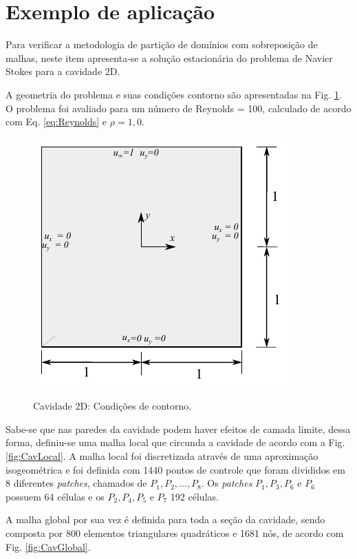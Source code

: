 \documentclass[tese_patricia]{subfiles}
\begin{document}
\section{Exemplo de aplicação}

Para verificar a metodologia de partição de domínios com sobreposição de malhas, neste item apresenta-se a solução estacionária do problema de Navier Stokes para a cavidade 2D.

A geometria do problema e suas condições contorno são apresentadas na Fig. \ref{fig:CavBoundary}. O problema foi avaliado para um número de Reynolds = 100, calculado de acordo com Eq. \eqref{eq:Reynolds} e $\rho = 1,0$.

\begin{figure}[!htb]
	\centering
	{\includegraphics[scale=1.3,trim=0cm 0cm 0cm 0cm, clip=true]{Imagens/Cap4/cavidade.pdf}}
	\caption{Cavidade 2D: Condições de contorno.} 
	\label{fig:CavBoundary}
\end{figure}

Sabe-se que nas paredes da cavidade podem haver efeitos de camada limite, dessa forma, definiu-se uma malha local que circunda a cavidade de acordo com a Fig. \ref{fig:CavLocal}. A malha local foi discretizada através de uma aproximação isogeométrica e foi definida com 1440 pontos de controle que foram divididos em 8 diferentes \textit{patches}, chamados de $P_{1},P_{2},...,P_{8}$. Os \textit{patches} $P_{1},P_{3},P_{6}$ e $P_{6}$ possuem 64 células e os $P_{2},P_{4},P_{5}$ e $P_{7}$ 192 células.

A malha global por sua vez é definida para toda a seção da cavidade, sendo composta por 800 elementos triangulares quadráticos e 1681 nós, de acordo com Fig. \ref{fig:CavGlobal}.
\end{document}
